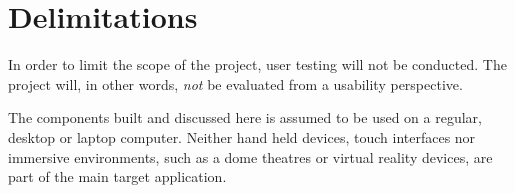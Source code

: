 

\section{Delimitations}
\label{sec:delimitations}


In order to limit the scope of the project, user testing will not be conducted. The project will, in other words, \emph{not} be evaluated from a usability perspective.

The components built and discussed here is assumed to be used on a regular, desktop or laptop computer. Neither hand held devices, touch interfaces nor immersive environments, such as a dome theatres or virtual reality devices, are part of the main target application.
